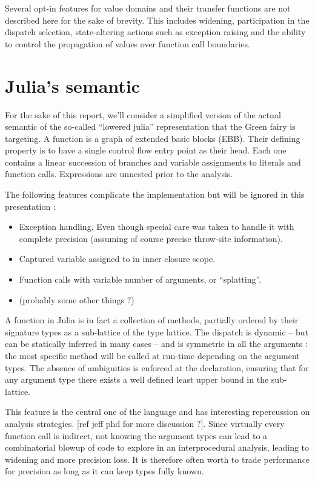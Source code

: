 \documentclass[11pt]{article}
\begin{document}
Several opt-in features for value domains and their transfer functions are not described here for the sake of brevity. This includes widening, participation in the dispatch selection, state-altering actions such as exception raising and the ability to control the propagation of values over function call boundaries.

\section*{Julia's semantic}

For the sake of this report, we'll consider a simplified version of the actual semantic of the so-called ``lowered julia'' representation that the Green fairy is targeting. A function is a graph of extended basic blocks (EBB). Their defining property is to have a single control flow entry point as their head. Each one contains a linear succession of branches and variable assignments to literals and function calls. Expressions are unnested prior to the analysis.

The following features complicate the implementation but will be ignored in this presentation :
\begin{itemize}
\item Exception handling. Even though special care was taken to handle it with complete precision (assuming of course precise throw-site information).
\item Captured variable assigned to in inner closure scope.
\item Function calls with variable number of arguments, or ``splatting''.
\item (probably some other things ?)
\end{itemize}

A function in Julia is in fact a collection of methods, partially ordered by their signature types as a sub-lattice of the type lattice.
The dispatch is dynamic -- but can be statically inferred in many cases -- and is symmetric in all the arguments : the most specific method will be called at run-time depending on the argument types.
The absence of ambiguities is enforced at the declaration, ensuring that for any argument type there exists a well defined least upper bound in the sub-lattice.

This feature is the central one of the language and has interesting repercussion on analysis strategies. [ref jeff phd for more discussion ?]. Since virtually every function call is indirect, not knowing the argument types can lead to a combinatorial blowup of code to explore in an interprocedural analysis, leading to widening and more precision loss. It is therefore often worth to trade performance for precision as long as it can keep types fully known.
\end{document}
